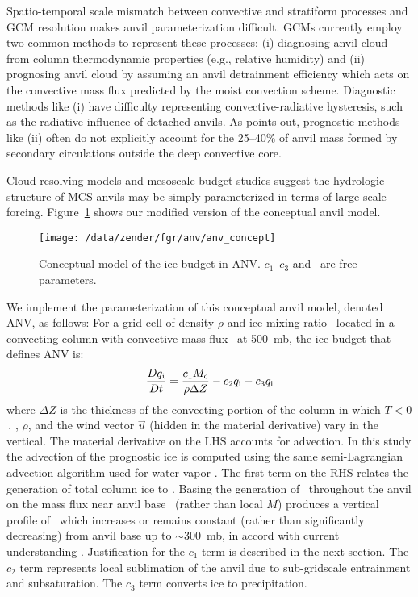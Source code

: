 \documentclass[twoside,agupp]{aguplus}
\begin{document}
Spatio-temporal scale mismatch between convective and stratiform
processes and GCM resolution makes anvil parameterization difficult.
GCMs currently employ two common methods to represent these processes:
(i) diagnosing anvil cloud from column thermodynamic properties (e.g.,
relative humidity) and (ii) prognosing anvil cloud by assuming an
anvil detrainment efficiency which acts on the convective mass flux
predicted by the moist convection scheme.
Diagnostic methods like (i) have difficulty representing
convective-radiative hysteresis, such as the radiative influence of 
detached anvils.
As \cite{Don93} points out, prognostic methods like (ii) often do not
explicitly account for the 25--40\% of anvil mass formed by secondary
circulations outside the deep convective core.

Cloud resolving models and mesoscale budget studies suggest the
hydrologic structure of MCS anvils may be simply parameterized in
terms of large scale forcing.  
Figure~\ref{fig:anv_concept} shows our modified version of the
\cite{LeH80} conceptual anvil model.
\begin{figure}
\begin{center}
\texttt{[image: /data/zender/fgr/anv/anv\_concept]}\vfill
\end{center}
\caption{
Conceptual model of the ice budget in ANV. 
$c_1$--$c_3$ and \pc\ are free parameters.
\label{fig:anv_concept}}
\end{figure}
We implement the parameterization of this conceptual anvil model,
denoted ANV, as follows:  
For a grid cell of density $\rho$ and ice mixing ratio \qi\ located in
a convecting column with convective mass flux \Mc\ at 500~mb,
the ice budget that defines ANV is:
\begin{equation}
\label{eqn:qi_cnv}
{D\qi \over Dt} = {c_1 \Mc \over \rho \Delta Z} - c_2 \qi - c_3 \qi
\end{equation}
where $\Delta Z$ is the thickness of the convecting portion of the
column in which $T < 0$\,\dgrc.
\qi, $\rho$, and the wind vector $\vec u$ (hidden in the material
derivative) vary in the vertical.
The material derivative on the LHS accounts for advection.
In this study the advection of the prognostic ice is computed using
the same semi-Lagrangian advection algorithm used for water vapor
\cite{WiR94}.    
The first term on the RHS relates the generation of total column ice
to \Mc.
Basing the generation of \qi\ throughout the anvil on the mass flux
near anvil base \Mc\ (rather than local $M$) produces a vertical
profile of \qi\ which increases or remains constant (rather than
significantly decreasing) from anvil base up to $\sim 300$~mb, in
accord with current understanding \cite[e.g.,][]{Hou89,WSS931}.
Justification for the $c_1$ term is described in the next section.
The $c_2$ term represents local sublimation of the anvil due to 
sub-gridscale entrainment and subsaturation.
The $c_3$ term converts ice to precipitation.
\end{document}
